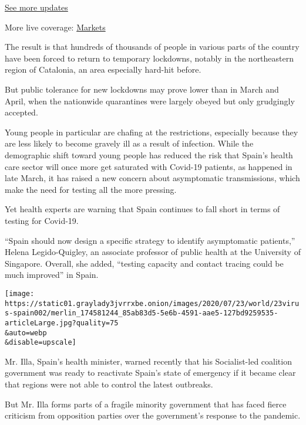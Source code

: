 \href{https://www.nytimes3xbfgragh.onion/2020/08/21/world/covid-19-coronavirus.html?action=click\&pgtype=Article\&state=default\&region=MAIN_CONTENT_1\&context=storylines_live_updates}{See
more updates}

More live coverage:
\href{https://www.nytimes3xbfgragh.onion/live/2020/08/21/business/stock-market-today-coronavirus?action=click\&pgtype=Article\&state=default\&region=MAIN_CONTENT_1\&context=storylines_live_updates}{Markets}

The result is that hundreds of thousands of people in various parts of
the country have been forced to return to temporary lockdowns, notably
in the northeastern region of Catalonia, an area especially hard-hit
before.

But public tolerance for new lockdowns may prove lower than in March and
April, when the nationwide quarantines were largely obeyed but only
grudgingly accepted.

Young people in particular are chafing at the restrictions, especially
because they are less likely to become gravely ill as a result of
infection. While the demographic shift toward young people has reduced
the risk that Spain's health care sector will once more get saturated
with Covid-19 patients, as happened in late March, it has raised a new
concern about asymptomatic transmissions, which make the need for
testing all the more pressing.

Yet health experts are warning that Spain continues to fall short in
terms of testing for Covid-19.

``Spain should now design a specific strategy to identify asymptomatic
patients,'' Helena Legido-Quigley, an associate professor of public
health at the University of Singapore. Overall, she added, ``testing
capacity and contact tracing could be much improved'' in Spain.

\texttt{[image: https://static01.graylady3jvrrxbe.onion/images/2020/07/23/world/23virus-spain002/merlin\_174581244\_85ab83d5-5e6b-4591-aae5-127bd9259535-articleLarge.jpg?quality=75\\\&auto=webp\\\&disable=upscale]}

Mr. Illa, Spain's health minister, warned recently that his
Socialist-led coalition government was ready to reactivate Spain's state
of emergency if it became clear that regions were not able to control
the latest outbreaks.

But Mr. Illa forms parts of a fragile minority government that has faced
fierce criticism from opposition parties over the government's response
to the pandemic.

